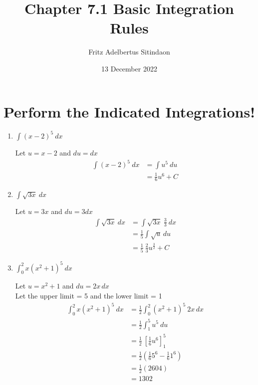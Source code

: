 \documentclass[12pt]{article}
\title{Chapter 7.1 Basic Integration Rules}
\author{Fritz Adelbertus Sitindaon}
\date{13 December 2022}
\begin{document}
\maketitle

\section{Perform the Indicated Integrations!}  
  
\begin{enumerate}
\item $\displaystyle\int(x-2)^5 \ dx $

Let $u = x-2$ and $du = dx$
\begin{equation*}
\begin{aligned}
\int(x-2)^5 \ dx &= \int u^5 \ du \\
&= \frac{1}{6}u^6 + C
\end{aligned}
\end{equation*}

\item $\displaystyle\int\sqrt{3x} \ dx $

Let $u = 3x$ and $du = 3dx$
\begin{equation*}
\begin{aligned}
\int \sqrt{3x} \ dx &= \int \sqrt{3x}\ \frac{3}{3} \ dx \\
&= \frac{1}{5} \int \sqrt{u} \, du \\
&= \frac{1}{5} \ \frac{2}{3} u^{\frac{3}{2}} + C
\end{aligned}
\end{equation*}
  
\item $\displaystyle\int_0^2x(x^2+1)^5 \ dx $

Let $u = x^2+1$ and $du = 2x\,dx$ \\
Let the upper limit = 5 and the lower limit = 1 
\begin{equation*}
\begin{aligned}
\int_0^2x(x^2+1)^5 \ dx  &= \frac{1}{2} \int_0^2(x^2+1)^5 \ 2x\,dx \\
&= \frac{1}{2} \int_1^5 u^5 \ du \\
&= \frac{1}{2} \ \left[\frac{1}{6} u^6\right]_1^5 \\
&= \frac{1}{2} \left(\frac{1}{6} 5^6 - \frac{1}{6} 1^6 \right) \\
&= \frac{1}{2} (2604) \\
&= 1302
\end{aligned}
\end{equation*}


\end{enumerate}
\end{document}
